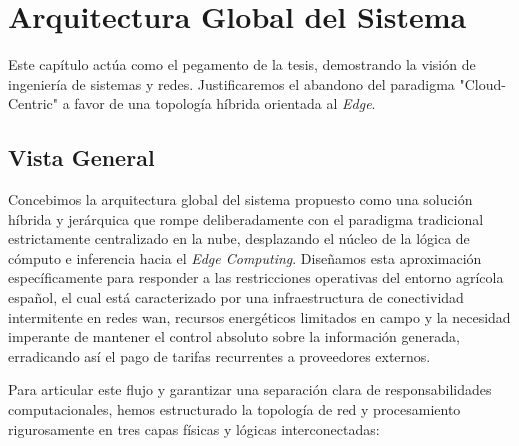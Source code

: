 \chapter{Arquitectura Global del Sistema}
Este capítulo actúa como el pegamento de la tesis, demostrando la visión de ingeniería de sistemas y redes. Justificaremos el abandono del paradigma "Cloud-Centric" a favor de una topología híbrida orientada al \textit{Edge}.

\section{Vista General}

Concebimos la arquitectura global del sistema propuesto como una solución híbrida y jerárquica que rompe deliberadamente con el paradigma tradicional estrictamente centralizado en la nube, desplazando el núcleo de la lógica de cómputo e inferencia hacia el \textit{Edge Computing}. Diseñamos esta aproximación específicamente para responder a las restricciones operativas del entorno agrícola español, el cual está caracterizado por una infraestructura de conectividad intermitente en redes \gls{wan}, recursos energéticos limitados en campo y la necesidad imperante de mantener el control absoluto sobre la información generada, erradicando así el pago de tarifas recurrentes a proveedores externos.

Para articular este flujo y garantizar una separación clara de responsabilidades computacionales, hemos estructurado la topología de red y procesamiento rigurosamente en tres capas físicas y lógicas interconectadas:

